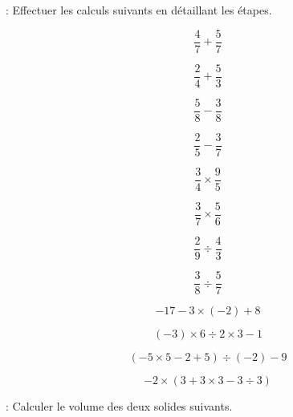 : Effectuer les calculs suivants en détaillant les étapes.

\begin{multicols}{4}
    $$\dfrac{4}{7}+\dfrac{5}{7}$$ \vspace*{2.5cm}\columnbreak

    $$\dfrac{2}{4}+\dfrac{5}{3}$$ \vspace*{2.5cm}\columnbreak

    $$\dfrac{5}{8}-\dfrac{3}{8}$$ \vspace*{2.5cm}\columnbreak

    $$\dfrac{2}{5}-\dfrac{3}{7}$$ \vspace*{2.5cm}
\end{multicols}

\begin{multicols}{4}
    $$\dfrac{3}{4}\times\dfrac{9}{5}$$ \vspace*{2.5cm}\columnbreak

    $$\dfrac{3}{7}\times\dfrac{5}{6}$$ \vspace*{2.5cm}\columnbreak

    $$\dfrac{2}{9}\div\dfrac{4}{3}$$ \vspace*{2.5cm}\columnbreak

    $$\dfrac{3}{8}\div\dfrac{5}{7}$$ \vspace*{2.5cm}
\end{multicols}

\begin{multicols}{2}
    $$-17-3\times (-2)+8$$ \vspace*{4cm}\columnbreak

    $$(-3)\times 6 \div 2\times 3-1$$ \vspace*{4cm}
\end{multicols}

\begin{multicols}{2}
    $$(-5\times 5 -2+5)\div (-2)-9$$ \vspace*{4cm}\columnbreak

    $$-2\times (3+3\times 3 -3\div 3)$$ \vspace*{4cm}
\end{multicols}

 : Calculer le volume des deux solides suivants.

